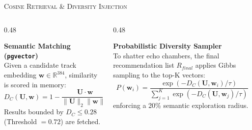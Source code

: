\documentclass[xcolor=dvipsnames, aspectratio=1610]{beamer}
\begin{document}
\begin{frame}{\textsc{Cosine Retrieval \& Diversity Injection}}
  
  \begin{columns}[T]
    \begin{column}{0.48\textwidth}
      \begin{CommentBox}
        \textbf{Semantic Matching (\texttt{pgvector})} \\
        Given a candidate track embedding $\mathbf{w} \in \mathbb{R}^{384}$, similarity is scored in memory:
        \begin{equation}
            D_C(\mathbf{U}, \mathbf{w}) = 1 - \frac{\mathbf{U} \cdot \mathbf{w}}{\|\mathbf{U}\|_2 \|\mathbf{w}\|_2}
        \end{equation}
        Results bounded by $D_C \le 0.28$ (Threshold $= 0.72$) are fetched.
      \end{CommentBox}
    \end{column}
    \begin{column}{0.48\textwidth}
      \begin{ProposalBox}
        \textbf{Probabilistic Diversity Sampler} \\
        To shatter echo chambers, the final recommendation list $R_{final}$ applies Gibbs sampling to the top-K vectors:
        \begin{equation}
            P(\mathbf{w}_i) = \frac{\exp(-D_C(\mathbf{U}, \mathbf{w}_i) / \tau)}{\sum_{j=1}^K \exp(-D_C(\mathbf{U}, \mathbf{w}_j) / \tau)}
        \end{equation}
        enforcing a 20\% semantic exploration radius.
      \end{ProposalBox}
    \end{column}
  \end{columns}

\end{frame}

\end{document}
